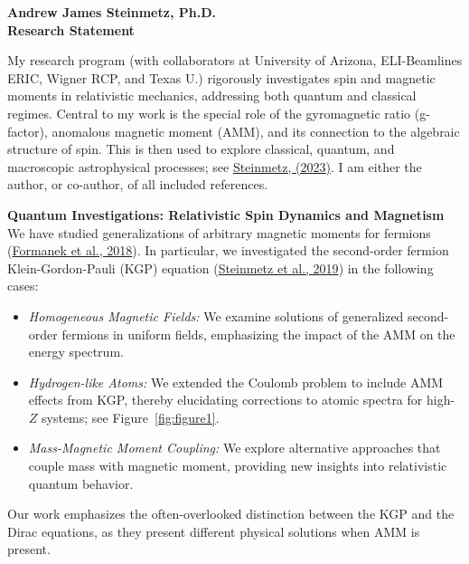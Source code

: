 \documentclass[11pt]{article}
\begin{document}
\begin{center}
    {\Large\textbf{Andrew James Steinmetz, Ph.D.}}\\[0.5em]
    {\large\textbf{Research Statement}}
\end{center}

My research program (with collaborators at University of Arizona, ELI-Beamlines ERIC, Wigner RCP, and Texas U.) rigorously investigates spin and magnetic moments in relativistic mechanics, addressing both quantum and classical regimes. Central to my work is the special role of the gyromagnetic ratio (g-factor), anomalous magnetic moment (AMM), and its connection to the algebraic structure of spin. This is then used to explore classical, quantum, and macroscopic astrophysical processes; see \href{http://hdl.handle.net/10150/670301}{Steinmetz, (2023)}. I am either the author, or co-author, of all included references.

{\large\textbf{Quantum Investigations: Relativistic Spin Dynamics and Magnetism}}\\
We have studied generalizations of arbitrary magnetic moments for fermions (\href{https://doi.org/10.1088/1361-6587/aac06a}{Formanek et al., 2018}). In particular, we investigated the second-order fermion Klein-Gordon-Pauli (KGP) equation (\href{https://doi.org/10.1140/epja/i2019-12715-5}{Steinmetz et al., 2019}) in the following cases:
\begin{itemize}[leftmargin=1.5em,nosep]
    \item \emph{Homogeneous Magnetic Fields:} We examine solutions of generalized second-order fermions in uniform fields, emphasizing the impact of the AMM on the energy spectrum.
    \item \emph{Hydrogen-like Atoms:} We extended the Coulomb problem to include AMM effects from KGP, thereby elucidating corrections to atomic spectra for high-\(Z\) systems; see Figure~\ref{fig:figure1}.
    \item \emph{Mass-Magnetic Moment Coupling:} We explore alternative approaches that couple mass with magnetic moment, providing new insights into relativistic quantum behavior.
\end{itemize}
Our work emphasizes the often-overlooked distinction between the KGP and the Dirac equations, as they present different physical solutions when AMM is present.
\end{document}
